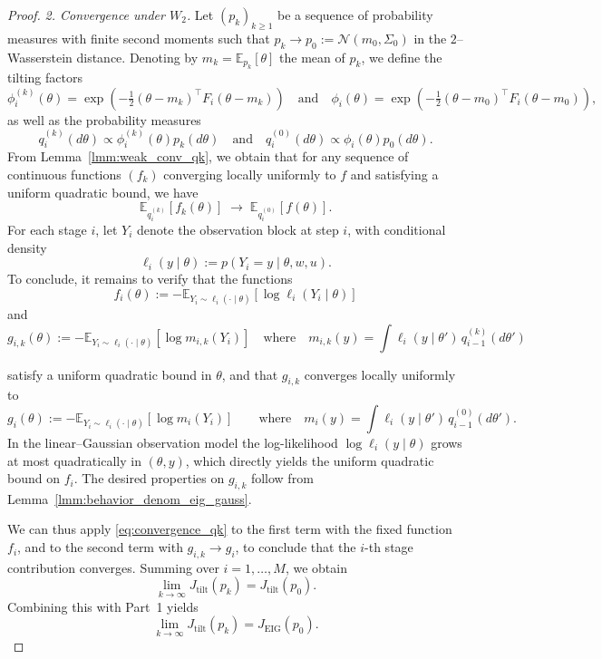 \documentclass[a4paper,11pt]{article}
\begin{document}
\begin{proof}
\noindent\textit{2. Convergence under $W_2$.}
Let $(p_k)_{k\ge1}$ be a sequence of probability measures with finite second moments such that
\(
p_k \to p_0 := \mathcal N(m_0,\Sigma_0)
\) in the $2$--Wasserstein distance.
Denoting by $m_k=\mathbb E_{p_k}[\theta]$ the mean of $p_k$, we define the tilting factors
\[
\phi_i^{(k)}(\theta)
=
\exp\!\left(-\tfrac12(\theta-m_k)^\top F_i (\theta-m_k)\right) \quad \text{and} \quad \phi_i(\theta)
=
\exp\!\left(-\tfrac12(\theta-m_0)^\top F_i (\theta-m_0)\right),
\]
as well as the probability measures
\[
q_i^{(k)}(d\theta)
\propto
\phi_i^{(k)}(\theta)p_k(d\theta)\quad \text{and} \quad 
q_i^{(0)}(d\theta)
\propto
\phi_i(\theta)p_0(d\theta).
\]
From Lemma~\ref{lmm:weak_conv_qk}, we obtain that for any sequence of continuous functions $(f_k)$ converging locally uniformly to $f$ and satisfying a uniform quadratic bound, we have
\begin{equation}
\mathbb{E}_{q_i^{(k)}}[f_k(\theta)]
\;\longrightarrow\;
\mathbb{E}_{q_i^{(0)}}[f(\theta)]. \label{eq:convergence_qk}
\end{equation}
For each stage \(i\), let \(Y_i\) denote the observation block at step \(i\),
with conditional density
\[
\ell_i(y\mid\theta):=p(Y_i=y\mid\theta,w,u).
\]
To conclude, it remains to verify that the functions
\[
f_i(\theta)
:=
-\mathbb{E}_{Y_i\sim \ell_i(\cdot\mid\theta)}
[\log \ell_i(Y_i\mid\theta)]
\]
and
\[
g_{i,k}(\theta)
:=
-\mathbb{E}_{Y_i\sim \ell_i(\cdot\mid\theta)}
[\log m_{i,k}(Y_i)] \quad \text{where} \quad m_{i,k}(y)
=
\int \ell_i(y\mid\theta')\,q_{i-1}^{(k)}(d\theta')
\]


satisfy a uniform quadratic bound in \(\theta\), and that \(g_{i,k}\) converges locally uniformly to 
\[
g_i(\theta)
:=
-\mathbb{E}_{Y_i\sim \ell_i(\cdot\mid\theta)}
[\log m_i(Y_i)]
\qquad \text{where} \quad
m_i(y)
=
\int \ell_i(y\mid\theta')\,q_{i-1}^{(0)}(d\theta').
\]
In the linear--Gaussian observation model the log-likelihood
$\log \ell_i(y\mid\theta)$ grows at most quadratically in $(\theta,y)$, which directly yields the uniform quadratic bound on $f_i$. The desired properties on \(g_{i,k}\) follow from Lemma~\ref{lmm:behavior_denom_eig_gauss}.

We can thus apply \eqref{eq:convergence_qk} to the first term with the fixed function \(f_i\), and to the second term with \(g_{i,k}\to g_i\), to conclude that the \(i\)-th stage contribution converges. Summing over \(i=1,\dots,M\), we obtain
\[
\lim_{k\to\infty} J_{\mathrm{tilt}}(p_k)
=
J_{\mathrm{tilt}}(p_0).
\]
Combining this with Part~1 yields
\[
\lim_{k\to\infty} J_{\mathrm{tilt}}(p_k)
=
J_{\mathrm{EIG}}(p_0).
\]
\end{proof}
\end{document}

